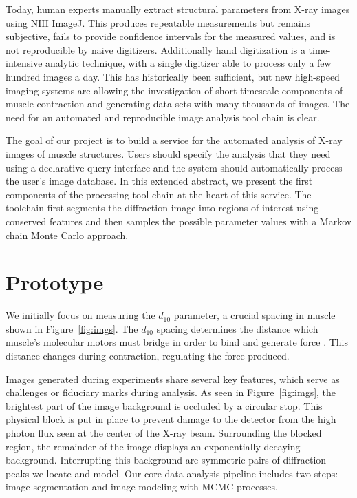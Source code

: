 \documentclass{sig-alternate}
\begin{document}
Today, human experts manually extract structural parameters
from X-ray images using NIH ImageJ. This produces repeatable
measurements but remains subjective, fails to provide confidence
intervals for the measured values, and is not reproducible by naive
digitizers. Additionally hand digitization is a time-intensive
analytic technique, with a single digitizer able to process only a few
hundred images a day.  This has historically been sufficient, but new
high-speed imaging systems are allowing the investigation of
short-timescale components of muscle contraction and generating data
sets with many thousands of images. The need for an automated and
reproducible image analysis tool chain is clear. 

The goal of our project is to build a service for the automated
analysis of X-ray images of muscle structures.  Users should specify
the analysis that they need using a declarative query interface and
the system should automatically process the user's image database.  In
this extended abstract, we present the first components of the
processing tool chain at the heart of this service. The toolchain
first segments the diffraction image into regions of interest using
conserved features and then samples the possible parameter values with
a Markov chain Monte Carlo approach.


\section{Prototype}
\label{sec:proto}


We initially focus on measuring the $d_{10}$ parameter, a crucial
spacing in muscle shown in Figure~\ref{fig:imgs}. The $d_{10}$ spacing
determines the distance which muscle's molecular motors must bridge in
order to bind and generate force \cite{Williams2013}. This distance
changes during contraction, regulating the force produced.

Images generated during experiments share several key features, which
serve as challenges or fiduciary marks during analysis. As seen in
Figure~\ref{fig:imgs}, the brightest part of the image background is
occluded by a circular stop. This physical block is put in place to
prevent damage to the detector from the high photon flux seen at the
center of the X-ray beam. Surrounding the blocked region, the
remainder of the image displays an exponentially decaying background.
Interrupting this background are symmetric pairs of diffraction peaks
we locate and model.  Our core data analysis pipeline includes two
steps: image segmentation and image modeling with MCMC processes.
\end{document}
